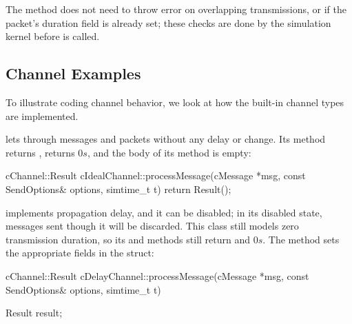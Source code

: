 \begin{ned}
The  method does not need to throw error on overlapping
transmissions, or if the packet's duration field is already set; these
checks are done by the simulation kernel before  is called.

%
%
%


\subsection{Channel Examples}
\label{sec:simple-modules:channel-examples}

To illustrate coding channel behavior, we look at how the built-in channel
types are implemented.

 lets through messages and packets without
any delay or change. Its  method returns
,  returns $0s$, and the
body of its  method is empty:

\begin{cpp}
cChannel::Result cIdealChannel::processMessage(cMessage *msg,
                    const SendOptions& options, simtime_t t)
{
    return Result();
}
\end{cpp}

 implements propagation delay, and it can be
disabled; in its disabled state, messages sent though it will be discarded.
This class still models zero transmission duration, so its
 and 
methods still return  and $0s$. The  method
sets the appropriate fields in the  struct:


\begin{cpp}
cChannel::Result cDelayChannel::processMessage(cMessage *msg,
                    const SendOptions& options, simtime_t t)
{
    Result result;

}
\end{cpp}
\end{ned}
